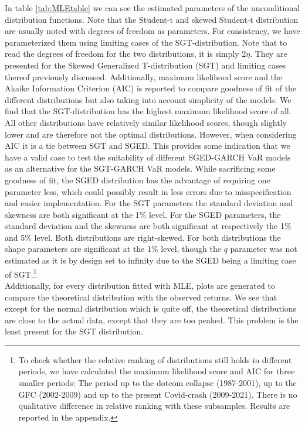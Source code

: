 \documentclass[a4paper, nobind]{templates/ociamthesis}
\begin{document}
In table \ref{tab:MLEtable} we can see the estimated parameters of the unconditional distribution functions. Note that the Student-t and skewed Student-t distribution are usually noted with degrees of freedom as parameters. For consistency, we have parameterized them using limiting cases of the SGT-distribution. Note that to read the degrees of freedom for the two distributions, it is simply \(2\eta\). They are presented for the Skewed Generalized T-distribution (SGT) and limiting cases thereof previously discussed. Additionally, maximum likelihood score and the Akaike Information Criterion (AIC) is reported to compare goodness of fit of the different distributions but also taking into account simplicity of the models. We find that the SGT-distribution has the highest maximum likelihood score of all. All other distributions have relatively similar likelihood scores, though slightly lower and are therefore not the optimal distributions. However, when considering AIC it is a tie between SGT and SGED. This provides some indication that we have a valid case to test the suitability of different SGED-GARCH VaR models as an alternative for the SGT-GARCH VaR models. While sacrificing some goodness of fit, the SGED distribution has the advantage of requiring one parameter less, which could possibly result in less errors due to misspecification and easier implementation. For the SGT parameters the standard deviation and skewness are both significant at the 1\% level. For the SGED parameters, the standard deviation and the skewness are both significant at respectively the 1\% and 5\% level. Both distributions are right-skewed. For both distributions the shape parameters are significant at the 1\% level, though the \(q\) parameter was not estimated as it is by design set to infinity due to the SGED being a limiting case of SGT.\footnote{To check whether the relative ranking of distributions still holds in different periods, we have calculated the maximum likelihood score and AIC for three smaller periods: The period up to the dotcom collapse (1987-2001), up to the GFC (2002-2009) and up to the present Covid-crash (2009-2021). There is no qualitative difference in relative ranking with these subsamples. Results are reported in the appendix.} ~\\

\noindent Additionally, for every distribution fitted with MLE, plots are generated to compare the theoretical distribution with the observed returns. We see that except for the normal distribution which is quite off, the theoretical distributions are close to the actual data, except that they are too peaked. This problem is the least present for the SGT distribution.
\end{document}
